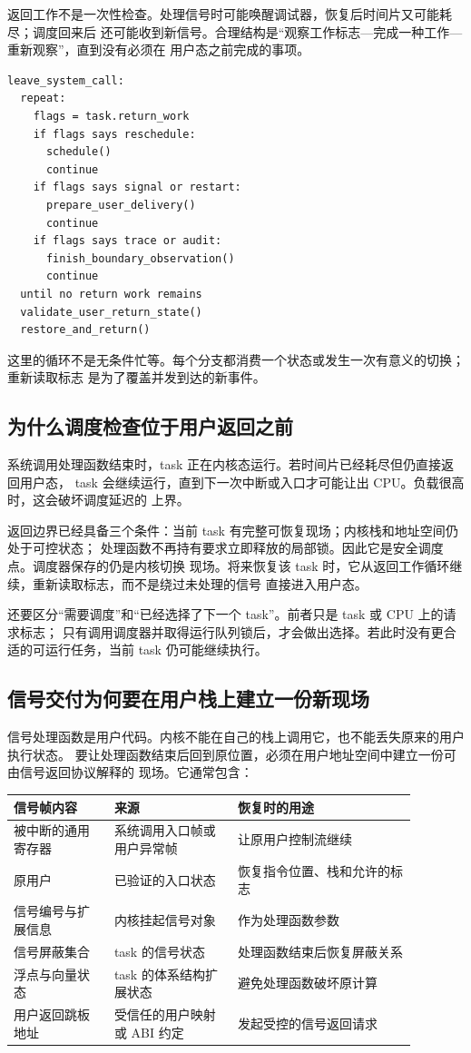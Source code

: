 返回工作不是一次性检查。处理信号时可能唤醒调试器，恢复后时间片又可能耗尽；调度回来后
还可能收到新信号。合理结构是“观察工作标志—完成一种工作—重新观察”，直到没有必须在
用户态之前完成的事项。

\begin{lstlisting}
leave_system_call:
  repeat:
    flags = task.return_work
    if flags says reschedule:
      schedule()
      continue
    if flags says signal or restart:
      prepare_user_delivery()
      continue
    if flags says trace or audit:
      finish_boundary_observation()
      continue
  until no return work remains
  validate_user_return_state()
  restore_and_return()
\end{lstlisting}

这里的循环不是无条件忙等。每个分支都消费一个状态或发生一次有意义的切换；重新读取标志
是为了覆盖并发到达的新事件。

\subsection{为什么调度检查位于用户返回之前}

系统调用处理函数结束时，task 正在内核态运行。若时间片已经耗尽但仍直接返回用户态，
task 会继续运行，直到下一次中断或入口才可能让出 CPU。负载很高时，这会破坏调度延迟的
上界。

返回边界已经具备三个条件：当前 task 有完整可恢复现场；内核栈和地址空间仍处于可控状态；
处理函数不再持有要求立即释放的局部锁。因此它是安全调度点。调度器保存的仍是内核切换
现场。将来恢复该 task 时，它从返回工作循环继续，重新读取标志，而不是绕过未处理的信号
直接进入用户态。

还要区分“需要调度”和“已经选择了下一个 task”。前者只是 task 或 CPU 上的请求标志；
只有调用调度器并取得运行队列锁后，才会做出选择。若此时没有更合适的可运行任务，当前
task 仍可能继续执行。

\subsection{信号交付为何要在用户栈上建立一份新现场}

信号处理函数是用户代码。内核不能在自己的栈上调用它，也不能丢失原来的用户执行状态。
要让处理函数结束后回到原位置，必须在用户地址空间中建立一份可由信号返回协议解释的
现场。它通常包含：

\begin{longtable}{|L{0.22\linewidth}|L{0.27\linewidth}|L{0.39\linewidth}|}
\hline
信号帧内容 & 来源 & 恢复时的用途 \\ \hline
被中断的通用寄存器 & 系统调用入口帧或用户异常帧 & 让原用户控制流继续 \\ \hline
原用户  & 已验证的入口状态 & 恢复指令位置、栈和允许的标志 \\ \hline
信号编号与扩展信息 & 内核挂起信号对象 & 作为处理函数参数 \\ \hline
信号屏蔽集合 & task 的信号状态 & 处理函数结束后恢复屏蔽关系 \\ \hline
浮点与向量状态 & task 的体系结构扩展状态 & 避免处理函数破坏原计算 \\ \hline
用户返回跳板地址 & 受信任的用户映射或 ABI 约定 & 发起受控的信号返回请求 \\ \hline
\end{longtable}

